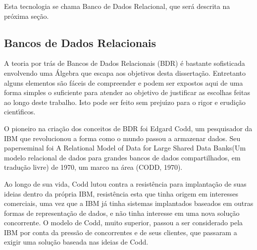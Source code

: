 \documentclass[
12pt,		%
openright,	%
twoside,  %
a4paper,			%
chapter=TITLE,		%
english,			%
french,				%
spanish,			%
brazil				%
]{USPSC-classe/USPSC}
\begin{document}
Esta tecnologia se chama \textquotedbl Banco de Dados Relacional\textquotedbl , que ser\'a descrita na pr\'oxima se\c{c}\~ao.










\subsection[Bancos de Dados Relacionais]{Bancos de Dados Relacionais}\label{Bancos de Dados Relacionais}
A teoria por tr\'as de Bancos de Dados Relacionais (BDR) \'e bastante sofisticada envolvendo uma \'Algebra que escapa aos objetivos desta disserta\c{c}\~ao. Entretanto alguns elementos s\~ao f\'aceis de compreender e podem ser expostos aqui de uma forma simples o suficiente para atender ao objetivo de justificar as escolhas feitas ao longo deste trabalho. Isto pode ser feito sem preju\'{\i}zo para o rigor e erudi\c{c}\~ao cient\'{\i}ficos.










O pioneiro na cria\c{c}\~ao dos conceitos de BDR foi Edgard Codd, um pesquisador da IBM que revolucionou a forma como o mundo passou a armazenar dados. Seu \textquotedbl paper\textquotedbl  seminal foi  \textquotedbl A Relational Model of Data for Large Shared Data Banks\textquotedbl  (\textquotedbl Um modelo relacional de dados para grandes bancos de dados compartilhados\textquotedbl , em tradu\c{c}\~ao livre) de 1970, um marco na \'area (CODD, 1970).










Ao longo de sua vida, Codd lutou contra a resist\^encia para implanta\c{c}\~ao de suas ideias dentro da pr\'opria IBM, resist\^encia esta que tinha origem em interesses comerciais, uma vez que a IBM j\'a tinha sistemas implantados baseados em outras formas de representa\c{c}\~ao de dados, e n\~ao tinha interesse em uma nova solu\c{c}\~ao concorrente. O modelo de Codd, muito superior, passou a ser considerado pela IBM por conta da press\~ao de concorrentes e de seus clientes, que passaram a exigir uma solu\c{c}\~ao baseada nas ideias de Codd.
\end{document}
